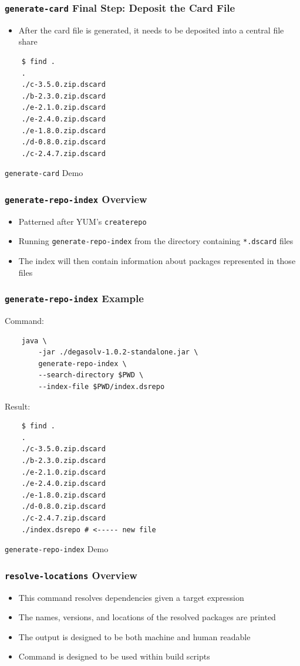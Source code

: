 \documentclass{beamer}
\begin{document}
\begin{frame}[fragile]
  \frametitle{\texttt{generate-card} Final Step: Deposit the Card File}
  \begin{itemize}
  \item After the card file is generated, it needs to be deposited into a
    central file share
  \end{itemize}
\begin{verbatim}
    $ find .
    .
    ./c-3.5.0.zip.dscard
    ./b-2.3.0.zip.dscard
    ./e-2.1.0.zip.dscard
    ./e-2.4.0.zip.dscard
    ./e-1.8.0.zip.dscard
    ./d-0.8.0.zip.dscard
    ./c-2.4.7.zip.dscard
\end{verbatim}
\end{frame}
\begin{frame}
  \centerline{\color{blue}\Large \texttt{generate-card} Demo}
\end{frame}
\begin{frame}
  \frametitle{\texttt{generate-repo-index} Overview}
  \begin{itemize}
  \item Patterned after YUM's \texttt{createrepo}
  \item Running \texttt{generate-repo-index} from the directory containing \texttt{*.dscard}
    files
  \item The index will then contain information about packages represented in those
    files
  \end{itemize}
\end{frame}
\begin{frame}[fragile]
  \frametitle{\texttt{generate-repo-index} Example}
  Command:
\begin{verbatim}
    java \
        -jar ./degasolv-1.0.2-standalone.jar \
        generate-repo-index \
        --search-directory $PWD \
        --index-file $PWD/index.dsrepo
\end{verbatim}
  Result:
\begin{verbatim}
    $ find .
    .
    ./c-3.5.0.zip.dscard
    ./b-2.3.0.zip.dscard
    ./e-2.1.0.zip.dscard
    ./e-2.4.0.zip.dscard
    ./e-1.8.0.zip.dscard
    ./d-0.8.0.zip.dscard
    ./c-2.4.7.zip.dscard
    ./index.dsrepo # <----- new file
\end{verbatim}
\end{frame}
\begin{frame}
  \centerline{\color{blue}\Large \texttt{generate-repo-index} Demo}
\end{frame}
\begin{frame}
  \frametitle{\texttt{resolve-locations} Overview}
  \begin{itemize}
  \item This command resolves dependencies given a target expression
  \item The names, versions, and locations of the resolved packages are printed
  \item The output is designed to be both machine and human readable
  \item Command is designed to be used within build scripts
  \end{itemize}
\end{frame}
\end{document}
